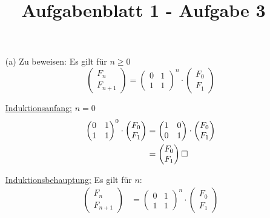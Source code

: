 \documentclass{article}
\title{Aufgabenblatt 1 - Aufgabe 3}
\author{}
\begin{document}
\maketitle

\begin{enumerate}
\item[(a)]
Zu beweisen: Es gilt für $n \geq 0$
\[
    \begin{pmatrix}
        F_{n} \\ F_{n+1}
    \end{pmatrix}
    =
    \begin{pmatrix}
        0 & 1 \\
        1 & 1
    \end{pmatrix}
    ^n \cdot
    \begin{pmatrix}
        F_0 \\ F_1
    \end{pmatrix}
\]

\underline{Induktionsanfang:} \quad $n = 0$
\begin{align*}
    \begin{pmatrix}
        0 & 1 \\
        1 & 1
    \end{pmatrix}
    ^0 \cdot
    \begin{pmatrix}
        F_0 \\ F_1
    \end{pmatrix}
    &=
    \begin{pmatrix}
        1 & 0 \\
        0 & 1
    \end{pmatrix}
    \cdot
    \begin{pmatrix}
        F_0 \\ F_1
    \end{pmatrix}
    \\
    &=
    \begin{pmatrix}
        F_0 \\ F_1
    \end{pmatrix}
    \hfill \square
\end{align*}

\underline{Induktionsbehauptung:} \quad Es gilt für $n$:
\begin{align*}   
    \begin{pmatrix}
        F_{n} \\ F_{n+1}
    \end{pmatrix}
    &=
    \begin{pmatrix}
        0 & 1 \\
        1 & 1
    \end{pmatrix}
    ^n \cdot
    \begin{pmatrix}
        F_0 \\ F_1
    \end{pmatrix}
\end{align*}


\end{enumerate}
\end{document}
